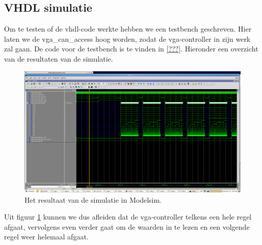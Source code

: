 \documentclass{scrartcl}  %
\begin{document}
\subsection{VHDL simulatie}
Om te testen of de vhdl-code werkte hebben we een testbench geschreven. Hier laten we de vga\_can\_access hoog worden, zodat de vga-controller in zijn werk zal gaan. De code voor de testbench is te vinden in \ref{???}. Hieronder een overzicht van de resultaten van de simulatie.
\begin{figure}[H]
\centering
		\includegraphics[width=1\textwidth]{images/simmodvgafinal.png}
		
		\caption{Het resultaat van de simulatie in Modelsim.}
		\label{fig:sim}
\end{figure}
Uit figuur \ref{fig:sim} kunnen we dus afleiden dat de vga-controller telkens een hele regel afgaat, vervolgens even verder gaat om de waarden in te lezen en een volgende regel weer helemaal afgaat. 
\end{document}
